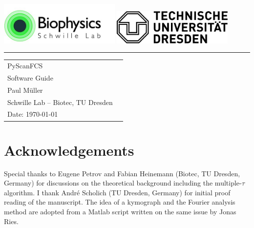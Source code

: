 \documentclass[a4paper,12pt]{scrartcl}
\begin{document}
\vspace{-5em}
\begin{flushleft}
	\includegraphics[angle=0,width=60mm]{Images/SchwilleLogo} \hspace{10em}
	\includegraphics[angle=0,width=60mm]{Images/TU_Logo_SW} 
\end{flushleft}
\begin{center}\rule{\textwidth}{0.1ex}\par\end{center}



\vspace{1em}

\noindent\begin{tabular}{ll}
 PyScanFCS \\
 Software Guide \\
 Paul Müller \\
 Schwille Lab -- Biotec, TU Dresden \\
 Date: \today 
 
\end{tabular}

\vspace{2em}

\tableofcontents


\newpage

\graphicspath{{Images/}}



\section*{Acknowledgements}
Special thanks to Eugene Petrov and Fabian Heinemann (Biotec, TU Dresden, Germany) for discussions on the theoretical background including the multiple-$\tau$ algorithm. I thank André Scholich (TU Dresden, Germany) for initial proof reading of the manuscript. The idea of a kymograph and the Fourier analysis method are adopted from a Matlab script written on the same issue by Jonas Ries.
\end{document}
